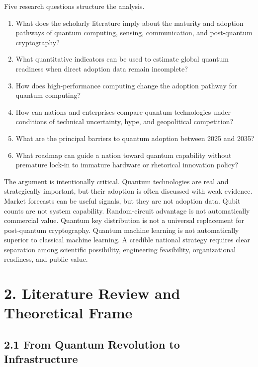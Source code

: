 \documentclass[
  11pt,
  letterpaper,
]{article}
\providecommand{\tightlist}{%
  \setlength{\itemsep}{0pt}\setlength{\parskip}{0pt}}
\begin{document}
Five research questions structure the analysis.

\begin{enumerate}
\def\labelenumi{\arabic{enumi}.}
\tightlist
\item
  What does the scholarly literature imply about the maturity and
  adoption pathways of quantum computing, sensing, communication, and
  post-quantum cryptography?
\item
  What quantitative indicators can be used to estimate global quantum
  readiness when direct adoption data remain incomplete?
\item
  How does high-performance computing change the adoption pathway for
  quantum computing?
\item
  How can nations and enterprises compare quantum technologies under
  conditions of technical uncertainty, hype, and geopolitical
  competition?
\item
  What are the principal barriers to quantum adoption between 2025 and
  2035?
\item
  What roadmap can guide a nation toward quantum capability without
  premature lock-in to immature hardware or rhetorical innovation
  policy?
\end{enumerate}

The argument is intentionally critical. Quantum technologies are real
and strategically important, but their adoption is often discussed with
weak evidence. Market forecasts can be useful signals, but they are not
adoption data. Qubit counts are not system capability. Random-circuit
advantage is not automatically commercial value. Quantum key
distribution is not a universal replacement for post-quantum
cryptography. Quantum machine learning is not automatically superior to
classical machine learning. A credible national strategy requires clear
separation among scientific possibility, engineering feasibility,
organizational readiness, and public value.

\section{2. Literature Review and Theoretical
Frame}\label{literature-review-and-theoretical-frame}

\subsection{2.1 From Quantum Revolution to
Infrastructure}\label{from-quantum-revolution-to-infrastructure}
\end{document}
